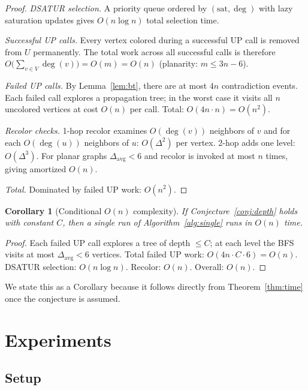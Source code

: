 \documentclass[11pt,twocolumn]{article}
\newtheorem{corollary}[theorem]{Corollary}
\begin{document}
\begin{proof}
\emph{DSATUR selection.} A priority queue ordered by $(\mathrm{sat},\deg)$
with lazy saturation updates gives $O(n\log n)$ total selection time.

\emph{Successful UP calls.} Every vertex colored during a successful UP
call is removed from $U$ permanently.  The total work across all
successful calls is therefore $O\!\bigl(\sum_{v\in V}\deg(v)\bigr)
=O(m)=O(n)$ (planarity: $m\leq 3n-6$).

\emph{Failed UP calls.} By Lemma~\ref{lem:bt}, there are at most $4n$
contradiction events.  Each failed call explores a propagation tree; in
the worst case it visits all $n$ uncolored vertices at cost $O(n)$ per
call.  Total: $O(4n\cdot n)=O(n^2)$.

\emph{Recolor checks.} 1-hop recolor examines $O(\deg(v))$ neighbors of
$v$ and for each $O(\deg(u))$ neighbors of $u$: $O(\Delta^2)$ per vertex.
2-hop adds one level: $O(\Delta^3)$.  For planar graphs $\Delta_{\mathrm{avg}}<6$
and recolor is invoked at most $n$ times, giving amortized $O(n)$.

\emph{Total.} Dominated by failed UP work: $O(n^2)$.
\end{proof}

\begin{corollary}[Conditional $O(n)$ complexity]
\label{cor:on}
If Conjecture~\ref{conj:depth} holds with constant $C$, then a single
run of Algorithm~\ref{alg:single} runs in $O(n)$ time.
\end{corollary}

\begin{proof}
Each failed UP call explores a tree of depth $\leq C$; at each level the
BFS visits at most $\Delta_{\mathrm{avg}}<6$ vertices.  Total failed UP
work: $O(4n\cdot C\cdot 6)=O(n)$.  DSATUR selection: $O(n\log n)$.
Recolor: $O(n)$.  Overall: $O(n)$.
\end{proof}

We state this as a Corollary because it follows directly from
Theorem~\ref{thm:time} once the conjecture is assumed.

\section{Experiments}
\label{sec:exp}

\subsection{Setup}
\end{document}

